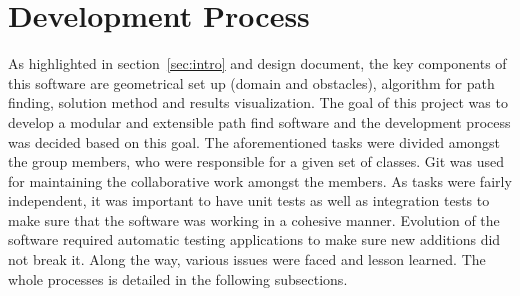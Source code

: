 \section{Development Process}
\label{sec:dev_process}
As highlighted in section~\ref{sec:intro} and design document, the key components of this software are geometrical set up (domain and obstacles), algorithm for path finding, solution method and results visualization. The goal of this project was to develop a modular and extensible path find software and the development process was decided based on this goal. The aforementioned tasks were divided amongst the group members, who were responsible for a given set of classes. Git was used for maintaining the collaborative work amongst the members. As tasks were fairly independent, it was important to have unit tests as well as integration tests to make sure that the software was working in a cohesive manner. Evolution of the software required automatic testing applications to make sure new additions did not break it. Along the way, various issues were faced and lesson learned. The whole processes is detailed in the following subsections.
